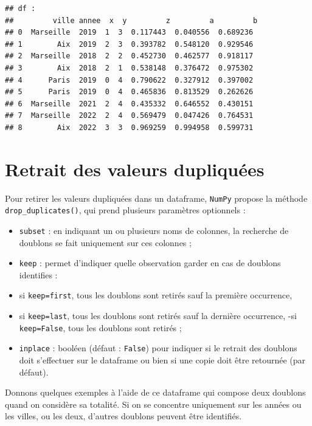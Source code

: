 \documentclass[12pt,]{book}
\numberwithin{equation}{section}
\numberwithin{countremarque}{section}
\begin{document}
\begin{lstlisting}
## df : 
##         ville annee  x  y         z         a         b
## 0  Marseille  2019  1  3  0.117443  0.040556  0.689236
## 1        Aix  2019  2  3  0.393782  0.548120  0.929546
## 2  Marseille  2018  2  2  0.452730  0.462577  0.918117
## 3        Aix  2018  2  1  0.538148  0.376472  0.975302
## 4      Paris  2019  0  4  0.790622  0.327912  0.397002
## 5      Paris  2019  0  4  0.465836  0.813529  0.262626
## 6  Marseille  2021  2  4  0.435332  0.646552  0.430151
## 7  Marseille  2022  2  4  0.569479  0.047426  0.764531
## 8        Aix  2022  3  3  0.969259  0.994958  0.599731
\end{lstlisting}

\section{Retrait des valeurs
dupliquées}\label{retrait-des-valeurs-dupliquees}

Pour retirer les valeurs dupliquées dans un dataframe, \texttt{NumPy}
propose la méthode \texttt{drop\_duplicates()}, qui prend plusieurs
paramètres optionnels :

\begin{itemize}
\item
  \texttt{subset} : en indiquant un ou plusieurs noms de colonnes, la
  recherche de doublons se fait uniquement sur ces colonnes ;
\item
  \texttt{keep} : permet d'indiquer quelle observation garder en cas de
  doublons identifies :
\item
  si \texttt{keep=\textquotesingle{}first\textquotesingle{}}, tous les
  doublons sont retirés sauf la première occurrence,
\item
  si \texttt{keep=\textquotesingle{}last\textquotesingle{}}, tous les
  doublons sont retirés sauf la dernière occurrence, -si
  \texttt{keep=\textquotesingle{}False\textquotesingle{}}, tous les
  doublons sont retirés ;
\item
  \texttt{inplace} : booléen (défaut : \texttt{False}) pour indiquer si
  le retrait des doublons doit s'effectuer sur le dataframe ou bien si
  une copie doit être retournée (par défaut).
\end{itemize}

Donnons quelques exemples à l'aide de ce dataframe qui compose deux
doublons quand on considère sa totalité. Si on se concentre uniquement
sur les années ou les villes, ou les deux, d'autres doublons peuvent
être identifiés.
\end{document}

